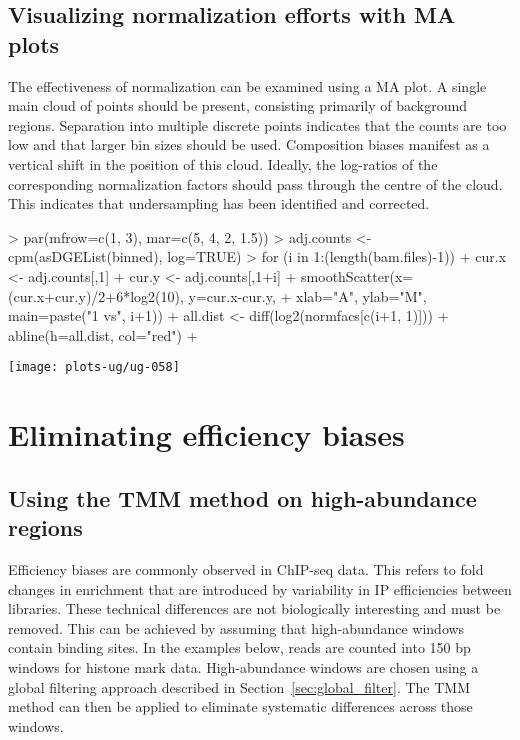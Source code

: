 \documentclass[12pt]{report}
\renewenvironment{Schunk}{\vspace{0pt}}{\vspace{0pt}}
\begin{document}
\subsection{Visualizing normalization efforts with MA plots}
The effectiveness of normalization can be examined using a MA plot. 
A single main cloud of points should be present, consisting primarily of background regions.
Separation into multiple discrete points indicates that the counts are too low and that larger bin sizes should be used. 
Composition biases manifest as a vertical shift in the position of this cloud. 
Ideally, the log-ratios of the corresponding normalization factors should pass through the centre of the cloud. 
This indicates that undersampling has been identified and corrected.


\begin{Schunk}
\begin{Sinput}
> par(mfrow=c(1, 3), mar=c(5, 4, 2, 1.5))
> adj.counts <- cpm(asDGEList(binned), log=TRUE)
> for (i in 1:(length(bam.files)-1)) {
+     cur.x <- adj.counts[,1]
+     cur.y <- adj.counts[,1+i]
+     smoothScatter(x=(cur.x+cur.y)/2+6*log2(10), y=cur.x-cur.y,
+         xlab="A", ylab="M", main=paste("1 vs", i+1))
+     all.dist <- diff(log2(normfacs[c(i+1, 1)]))
+     abline(h=all.dist, col="red")
+ }
\end{Sinput}
\end{Schunk}

\begin{center}
\texttt{[image: plots-ug/ug-058]}
\end{center}

\section{Eliminating efficiency biases}
\label{sec:eff_norm}

\subsection{Using the TMM method on high-abundance regions}
Efficiency biases are commonly observed in ChIP-seq data. 
This refers to fold changes in enrichment that are introduced by variability in IP efficiencies between libraries. 
These technical differences are not biologically interesting and must be removed. 
This can be achieved by assuming that high-abundance windows contain binding sites. 
In the examples below, reads are counted into 150 bp windows for histone mark data.
High-abundance windows are chosen using a global filtering approach described in Section~\ref{sec:global_filter}. 
The TMM method can then be applied to eliminate systematic differences across those windows.
\end{document}
